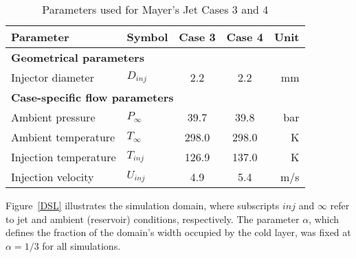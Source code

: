 \begin{table*}[htbp]
    \centering
    \caption{Parameters used for Mayer’s Jet Cases 3 and 4}
    \label{tab:mayer_combined}
    \renewcommand{\arraystretch}{1.2}
    \begin{tabular}{llccr}
        \toprule
        \textbf{Parameter} & \textbf{Symbol} & \textbf{Case 3} & \textbf{Case 4}
        & \textbf{Unit} \\
        \midrule
        \multicolumn{5}{l}{\textbf{Geometrical parameters}} \\
    
        Injector diameter    & $D_{inj}$               & 2.2   & 2.2   & mm \\
        \midrule
        \multicolumn{5}{l}{\textbf{Case-specific flow parameters}} \\
        Ambient pressure     & $P_\infty$              & 39.7  & 39.8  & bar \\
        Ambient temperature  & $T_\infty$              & 298.0 & 298.0 & K \\
        Injection temperature& $T_{inj}$               & 126.9 & 137.0 & K \\
        Injection velocity   & $U_{inj}$               & 4.9   & 5.4   & m/s \\
        \bottomrule
    \end{tabular}
\end{table*}


Figure~\ref{DSL} illustrates the simulation domain, where subscripts \(inj\) and
\(\infty\) refer to jet and ambient (reservoir) conditions, respectively. The
parameter \(\alpha\), which defines the fraction of the domain’s width occupied
by the cold layer, was fixed at \(\alpha = 1/3\) for all simulations.

